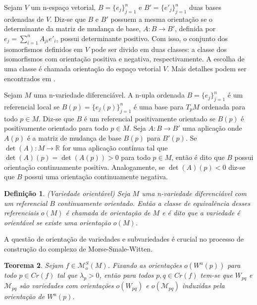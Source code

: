 \documentclass[12pt]{book}
\newtheorem{teorema}{Teorema}[section]
\newtheorem{definicao}[teorema]{Definição}
\newcommand{\espacomoduli}[2]{\mathcal{M}_{#1#2}}
\newcommand{\espacotangenteponto}[2]{T_{#1}#2}
\newcommand{\funcoesmorsesmale}[1]{\mathcal{M}^{S}_{o}(#1)}
\newcommand{\pontoscriticos}[1]{\textit{Cr}(#1)}
\newcommand{\real}[1]{\mathbb{R}^{#1}}
\newcommand{\reta}{\real{}}
\newcommand{\variedadeconectantepontos}[2]{W_{#1#2}}
\newcommand{\variedadeinstavel}[1]{W^{u}(#1)}
\begin{document}
	Sejam $V$ um n-espaço vetorial, $B=\{e_{j}\}_{j=1}^{n}$ e $B'=\{e'_{j}\}_{j=1}^{n}$ duas bases ordenadas de $V$. Diz-se que $B$ e $B'$ possuem a mesma orientação se o determinante da matriz de mudança de base, $A: B \to B'$, definida por $e_{j} = \sum_{i=1}^{n}A_{ji}e'_{i}$, possui determinante positivo. Com isso, o conjunto dos isomorfismos definidos em $V$ pode ser divido em duas classes: a classe dos isomorfismos com orientação positiva e negativa, respectivamente. A escolha de uma classe é chamada orientação do espaço vetorial $V$. Mais detalhes podem ser encontrados em \cite{kostrikin}. 
	
	Sejam $M$ uma n-variedade diferenciável. A n-upla ordenada $B=\{e_{j}\}_{j=1}^{n}$ é um referencial local se $B(p)=\{e_{j}(p)\}_{j=1}^{n}$ é uma base para $\espacotangenteponto{p}{M}$ ordenada para todo $p \in M$. Diz-se que $B$ é um referencial positivamente orientado se $B(p)$ é positivamente orientado para todo $p \in M$. Seja $A: B \to B'$ uma aplicação onde $A(p)$ é a matriz de mudança de base $B(p) $ para $B'(p)$. Se $\det(A):M \to \reta$ for uma aplicação contínua tal que $\det(A)(p) = \det(A(p))>0$ para todo $p \in M$, então é dito que $B$ possui orientação continuamente positiva. Analogamente, se $\det(A)(p)<0$ diz-se que $B$ possui uma orientação continuamente negativa.
	
	\begin{definicao}
		(Variedade orientável) Seja $M$ uma n-variedade diferenciável com um referencial $B$ continuamente orientado. Então a classe de equivalência desses referenciais $o(M)$ é chamada de orientação de $M$ e é dito que a variedade é orientável se existe uma orientação $o(M)$.
	\end{definicao}
	
	A questão de orientação de variedades e subvariedades é crucial no processo de construção do complexo de Morse-Smale-Witten.
	
	\begin{teorema}\label{teorema_orientacao_variedade_instavel}
		Sejam $f \in \funcoesmorsesmale{M}$. Fixando as orientações $o(\variedadeinstavel{p})$ para todo $p \in \pontoscriticos{f}$ tal que $\lambda_{p}>0$, então para todos $p,q \in \pontoscriticos{f}$ tem-se que $\variedadeconectantepontos{p}{q}$ e $\espacomoduli{p}{q}$ são variedades com orientações $o(\variedadeconectantepontos{p}{q})$ e $o(\espacomoduli{p}{q})$ induzidas pela orientação de $\variedadeinstavel{p}$.
	\end{teorema}
	
\end{document}
